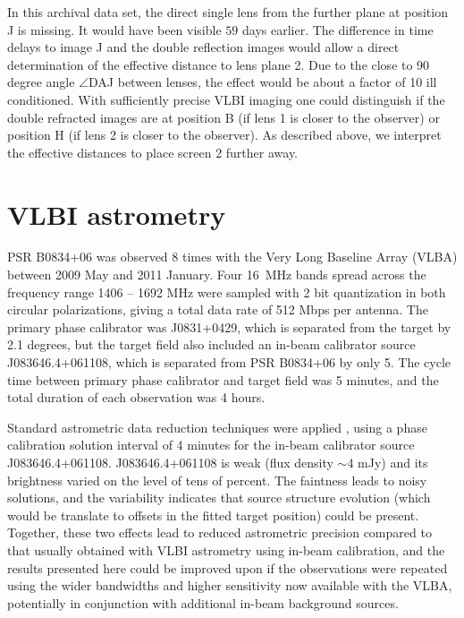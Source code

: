 \documentclass[useAMS,usenatbib]{mn2e}
\begin{document}

In this archival data set, the direct single lens from the further
plane at position J is missing.  It would have been visible $59$ days
earlier. The difference in time delays to image J and the double
reflection images would allow a direct determination of the effective
distance to lens plane 2.  Due to the close to 90 degree angle $\angle$DAJ
between lenses, the effect would be about a factor of 10 ill
conditioned.  With sufficiently precise VLBI imaging one could
distinguish if the double refracted images are at position B (if
lens 1 is closer to the observer) or position H (if lens 2 is closer to the observer).  As described above, we interpret
the effective distances to place screen 2 further away.


\section{VLBI astrometry}

PSR B0834+06 was observed 8 times with the Very Long Baseline Array (VLBA) between 2009 May and 2011 January.  Four 16~MHz bands spread across the frequency range 1406 -- 1692 MHz were sampled with 2 bit quantization in both circular polarizations, giving a total data rate of 512 Mbps per antenna.  The primary phase calibrator was J0831+0429, which is separated from the target by 2.1 degrees, but the target field also included an in-beam calibrator source J083646.4+061108, which is separated from PSR B0834+06 by only 5\arcmin.  The cycle time between primary phase calibrator and target field was 5 minutes, and the total duration of each observation was 4 hours.

Standard astrometric data reduction techniques were applied
\citep[e.g.,][]{deller12b,deller13a}, using a phase calibration
solution interval of 4 minutes for the in-beam calibrator source
J083646.4+061108.  J083646.4+061108 is weak (flux density $\sim$4 mJy)
and its brightness varied on the level of tens of percent.  The
faintness leads to noisy solutions, and the variability indicates that
source structure evolution (which would be translate to offsets in the
fitted target position) could be present.  Together, these two effects
lead to reduced astrometric precision compared to that usually
obtained with VLBI astrometry using in-beam calibration, and the
results presented here could be improved upon if the observations were
repeated using the wider bandwidths and higher sensitivity now
available with the VLBA, potentially in conjunction with additional
in-beam background sources.
\end{document}
